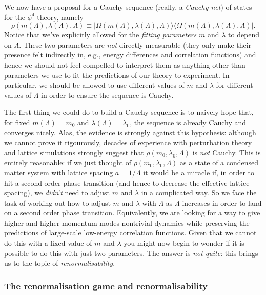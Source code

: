 \documentclass[11pt]{amsart}
\theoremstyle{plain}%
\theoremstyle{definition}
\theoremstyle{remark}
\begin{document}
We now have a proposal for a Cauchy sequence (really, a \emph{Cauchy net}) of states for the $\phi^4$ theory, namely
\begin{equation}
	\rho(m(\Lambda),\lambda(\Lambda), \Lambda) \equiv |\Omega(m(\Lambda),\lambda(\Lambda), \Lambda)\rangle\langle\Omega(m(\Lambda),\lambda(\Lambda), \Lambda)|.
\end{equation}
Notice that we've explicitly allowed for the \emph{fitting parameters} $m$ and $\lambda$ to depend on $\Lambda$. These two parameters are \emph{not} directly measurable (they only make their presence felt indirectly in, e.g., energy differences and correlation functions) and hence we should not feel compelled to interpret them as anything other than parameters we use to fit the predictions of our theory to experiment. In particular, we should be allowed to use different values of $m$ and $\lambda$ for different values of $\Lambda$ in order to ensure the sequence is Cauchy.

The first thing we could do to build a Cauchy sequence is to naively hope that, for fixed $m(\Lambda) = m_0$ and $\lambda(\Lambda) = \lambda_0$, the sequence is already Cauchy and converges nicely. Alas, the evidence is strongly against this hypothesis: although we cannot prove it rigourously, decades of experience with perturbation theory and lattice simulations strongly suggest that $\rho(m_0,\lambda_0, \Lambda)$ is \emph{not} Cauchy. This is entirely reasonable: if we just thought of $\rho(m_0,\lambda_0, \Lambda)$ as a state of a condensed matter system with lattice spacing $a = 1/\Lambda$ it would be a miracle if, in order to hit a second-order phase transition (and hence to decrease the effective lattice spacing), we \emph{didn't} need to adjust $m$ and $\lambda$ in a complicated way. So we face the task of working out how to adjust $m$ and $\lambda$ with $\Lambda$ as $\Lambda$ increases in order to land on a second order phase transition. Equivalently, we are looking for a way to give higher and higher momentum modes nontrivial dynamics while preserving the predictions of large-scale low-energy correlation functions. Given that we cannot do this with a fixed value of $m$ and $\lambda$ you might now begin to wonder if it is possible to do this with just two parameters. The answer is \emph{not quite}: this brings us to the topic of \emph{renormalisability}.

\subsubsection{The renormalisation game and renormalisability}
\end{document}
